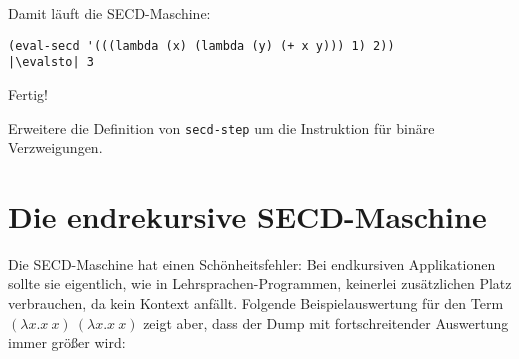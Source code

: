%
Damit läuft die SECD-Maschine:
%
\begin{lstlisting}
(eval-secd '(((lambda (x) (lambda (y) (+ x y))) 1) 2))
|\evalsto| 3
\end{lstlisting}
%
Fertig!
%
\begin{aufgabeinline}
  Erweitere die Definition von \lstinline{secd-step} um die 
  Instruktion für binäre Verzweigungen.
\end{aufgabeinline}

\section{Die endrekursive SECD-Maschine}

Die SECD-Maschine hat einen Schönheitsfehler: Bei endkursiven
Applikationen sollte sie eigentlich, wie in Lehrsprachen-Programmen, keinerlei
zusätzlichen Platz verbrauchen, da kein Kontext anfällt.  Folgende
Beispielauswertung für den Term $(\lambda x.x~x)~(\lambda x.x~x)$
zeigt aber, dass der Dump mit fortschreitender Auswertung immer
größer wird:
%
